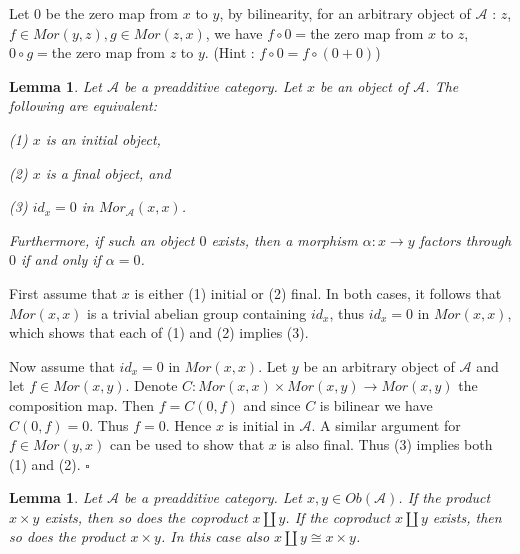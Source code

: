 \documentclass{article}
\newtheorem{lemma}[theorem]{Lemma}
\newenvironment{Proof}{{\noindent \indent \it Proof:\quad}}{\hfill $\square$\par}
\begin{document}
Let $0$ be the zero map from $x$ to $y$, by bilinearity, for an arbitrary object of $\mathscr A$ : $z$, $f\in Mor(y,z),g\in Mor(z,x)$, we have $f\circ 0=$the zero map from $x$ to $z$, $0\circ g=$the zero map from $z$ to $y$. (Hint : $f\circ 0=f\circ (0+0)$)
\begin{lemma}
    Let $\mathscr A$ be a preadditive category. Let $x$ be an object of $\mathscr A$. The following are equivalent:

(1) $x$ is an initial object,

(2) $x$ is a final object, and

(3) $id_x=0$ in $Mor_\mathscr A(x,x)$.

Furthermore, if such an object $0$ exists, then a morphism $\alpha:x\rightarrow y$ factors through $0$ if and only if $\alpha=0$.
\end{lemma}
\begin{Proof}
    First assume that $x$ is either (1) initial or (2) final. In both cases, it follows that $Mor(x,x)$ is a trivial abelian group containing $id_x$, thus $id_x=0$ in $Mor(x,x)$, which shows that each of (1) and (2) implies (3).

    Now assume that $id_x=0$ in $Mor(x,x)$. Let $y$ be an arbitrary object of $\mathscr A$ and let $f\in Mor(x,y)$. Denote $C:Mor(x,x)\times Mor(x,y)\rightarrow Mor(x,y)$ the composition map. Then $f=C(0,f)$ and since $C$ is bilinear we have $C(0,f)=0$. Thus $f=0$. Hence $x$ is initial in $\mathscr A$. A similar argument for $f\in Mor(y,x)$ can be used to show that $x$ is also final. Thus (3) implies both (1) and (2).
\end{Proof}
\begin{lemma}
    Let $\mathscr A$ be a preadditive category. Let $x,y\in Ob(\mathscr A)$. If the product $x\times y$ exists, then so does the coproduct $x\coprod y$. If the coproduct $x\coprod y$ exists, then so does the product $x\times y$. In this case also $x\coprod y\cong x\times y$.
\end{lemma}
\end{document}
